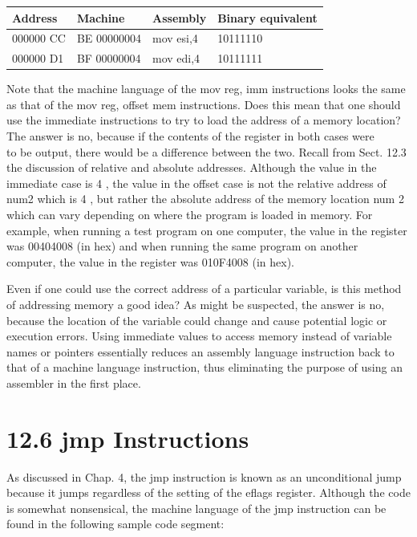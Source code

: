 \documentclass[10pt]{book}
\begin{document}
\begin{center}
\begin{tabular}{|l|l|l|l|}
\hline
Address & Machine & Assembly & Binary equivalent \\
\hline
000000 CC & BE 00000004 & mov esi,4 & 10111110 \\
\hline
000000 D1 & BF 00000004 & mov edi,4 & 10111111 \\
\hline
\end{tabular}
\end{center}

Note that the machine language of the mov reg, imm instructions looks the same as that of the mov reg, offset mem instructions. Does this mean that one should use the immediate instructions to try to load the address of a memory location? The answer is no, because if the contents of the register in both cases were\\
to be output, there would be a difference between the two. Recall from Sect. 12.3 the discussion of relative and absolute addresses. Although the value in the immediate case is 4 , the value in the offset case is not the relative address of num2 which is 4 , but rather the absolute address of the memory location num 2 which can vary depending on where the program is loaded in memory. For example, when running a test program on one computer, the value in the register was 00404008 (in hex) and when running the same program on another computer, the value in the register was 010F4008 (in hex).


Even if one could use the correct address of a particular variable, is this method of addressing memory a good idea? As might be suspected, the answer is no, because the location of the variable could change and cause potential logic or execution errors. Using immediate values to access memory instead of variable names or pointers essentially reduces an assembly language instruction back to that of a machine language instruction, thus eliminating the purpose of using an assembler in the first place.

\section*{12.6 jmp Instructions}
As discussed in Chap. 4, the jmp instruction is known as an unconditional jump because it jumps regardless of the setting of the eflags register. Although the code is somewhat nonsensical, the machine language of the jmp instruction can be found in the following sample code segment:
\end{document}
